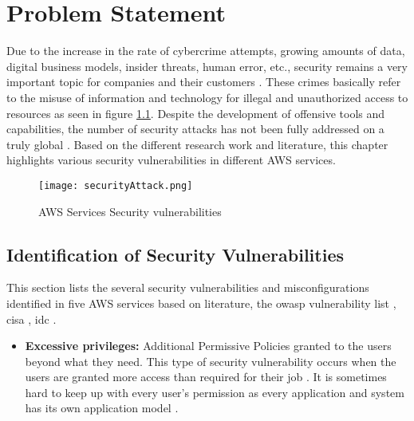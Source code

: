 
\chapter{Problem Statement}

\par Due to the increase in the rate of cybercrime attempts, growing amounts of data, digital business models, insider threats, human error, etc., security remains a very important topic for companies and their customers \cite{40}.  These crimes basically refer to the misuse of information and technology for illegal and unauthorized access to resources as seen in figure \ref{fig:securityAttack}. Despite the development of offensive tools and capabilities, the number of security attacks has not been fully addressed on a truly global \cite{38}. Based on the different research work and literature, this chapter highlights various security vulnerabilities in different AWS services.

\begin{figure}
    \centering
    \texttt{[image: securityAttack.png]}
    \caption{AWS Services Security vulnerabilities}
    \label{fig:securityAttack}
\end{figure}

\section{Identification of Security Vulnerabilities}

\par This section lists the several security vulnerabilities and misconfigurations identified in five AWS services
based on literature, the \gls{owasp} vulnerability list
\cite{43},
\gls{cisa}
\cite{42}, \gls{idc} \cite{41}.


\begin{itemize}
    \item \textbf{Excessive privileges:} Additional Permissive Policies granted to the users beyond what they need.
    This type
    of security vulnerability occurs when the users are granted more access than required for their job \cite{44}. It is
    sometimes hard to keep up with every user’s permission as every application and system has its own application
    model \cite{45}.
\end{itemize}

